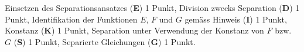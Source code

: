 \begin{bewertung}
Einsetzen des Separationsansatzes ({\bf E}) 1 Punkt,
Division zwecks Separation ({\bf D}) 1 Punkt,
Identifikation der Funktionen $E$, $F$ und $G$ gemäss Hinweis
({\bf I}) 1 Punkt,
Konstanz ({\bf K}) 1 Punkt,
Separation unter Verwendung der Konstanz von $F$ bzw.~$G$ ({\bf S}) 1 Punkt,
Separierte Gleichungen ({\bf G}) 1 Punkt.
\end{bewertung}



